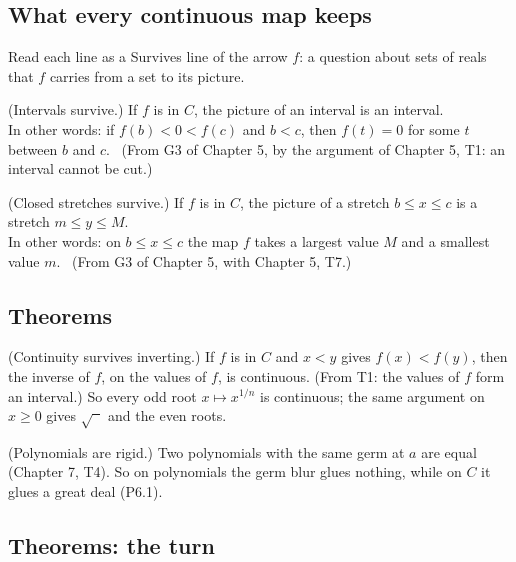 \subsection*{What every continuous map keeps}

Read each line as a Survives line of the arrow $f$: a question about sets of reals that $f$ carries from a set to its picture.
\begin{lines}
\item[\lab{T1}] (Intervals survive.) If $f$ is in $C$, the picture of an interval is an interval. \\
In other words: if $f(b) < 0 < f(c)$ and $b < c$, then $f(t) = 0$ for some $t$ between $b$ and $c$. \ (From G3 of Chapter 5, by the argument of Chapter 5, T1: an interval cannot be cut.)
\item[\lab{T2}] (Closed stretches survive.) If $f$ is in $C$, the picture of a stretch $b \le x \le c$ is a stretch $m \le y \le M$. \\
In other words: on $b \le x \le c$ the map $f$ takes a largest value $M$ and a smallest value $m$. \ (From G3 of Chapter 5, with Chapter 5, T7.)
\end{lines}

\subsection*{Theorems}

\begin{lines}
\item[\lab{T3}] (Continuity survives inverting.) If $f$ is in $C$ and $x < y$ gives $f(x) < f(y)$, then the inverse of $f$, on the values of $f$, is continuous. (From T1: the values of $f$ form an interval.) So every odd root $x \mapsto x^{1/n}$ is continuous; the same argument on $x \ge 0$ gives $\sqrt{\phantom{x}}$ and the even roots.
\item[\lab{T4}] (Polynomials are rigid.) Two polynomials with the same germ at $a$ are equal (Chapter 7, T4). So on polynomials the germ blur glues nothing, while on $C$ it glues a great deal (P6.1).
\end{lines}

\subsection*{Theorems: the turn}


